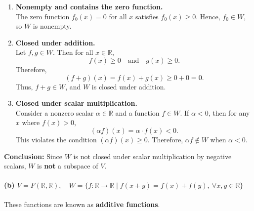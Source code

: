 \documentclass[12pt]{article}
\begin{document}
\begin{enumerate}
    \item \textbf{Nonempty and contains the zero function.} \\
    The zero function \( f_0(x) = 0 \) for all \( x \) satisfies \( f_0(x) \geq 0 \). Hence, \( f_0 \in W \), so \( W \) is nonempty.
    
    \item \textbf{Closed under addition.} \\
    Let \( f, g \in W \). Then for all \( x \in \mathbb{R} \),
    \[
        f(x) \geq 0 \quad \text{and} \quad g(x) \geq 0.
    \]
    Therefore,
    \[
        (f + g)(x) = f(x) + g(x) \geq 0 + 0 = 0.
    \]
    Thus, \( f + g \in W \), and \( W \) is closed under addition.
    
    \item \textbf{Closed under scalar multiplication.} \\
    Consider a nonzero scalar \( \alpha \in \mathbb{R} \) and a function \( f \in W \). If \( \alpha < 0 \), then for any \( x \) where \( f(x) > 0 \),
    \[
        (\alpha f)(x) = \alpha \cdot f(x) < 0.
    \]
    This violates the condition \( (\alpha f)(x) \geq 0 \). Therefore, \( \alpha f \notin W \) when \( \alpha < 0 \).
\end{enumerate}

\textbf{Conclusion:} Since \( W \) is not closed under scalar multiplication by negative scalars, \( W \) is \textbf{not} a subspace of \( V \).

\paragraph{(b) \( V = F(\mathbb{R}, \mathbb{R}),\quad W = \{ f : \mathbb{R} \to \mathbb{R} \mid f(x + y) = f(x) + f(y),\ \forall x, y \in \mathbb{R} \} \)}

These functions are known as \textbf{additive functions}.
\end{document}
